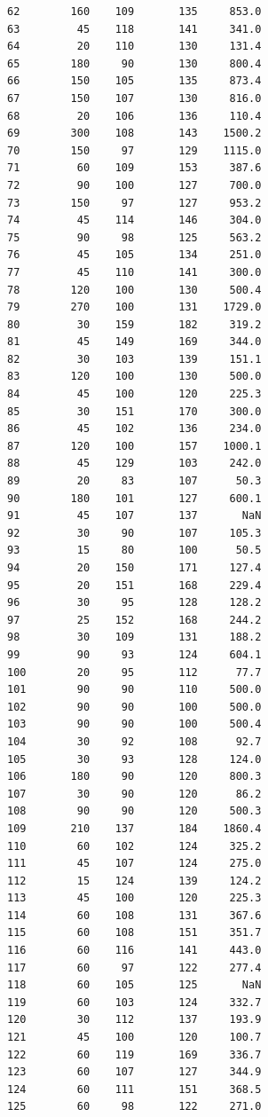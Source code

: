 \begin{code}
\begin{verbatim}
62        160    109       135     853.0
63         45    118       141     341.0
64         20    110       130     131.4
65        180     90       130     800.4
66        150    105       135     873.4
67        150    107       130     816.0
68         20    106       136     110.4
69        300    108       143    1500.2
70        150     97       129    1115.0
71         60    109       153     387.6
72         90    100       127     700.0
73        150     97       127     953.2
74         45    114       146     304.0
75         90     98       125     563.2
76         45    105       134     251.0
77         45    110       141     300.0
78        120    100       130     500.4
79        270    100       131    1729.0
80         30    159       182     319.2
81         45    149       169     344.0
82         30    103       139     151.1
83        120    100       130     500.0
84         45    100       120     225.3
85         30    151       170     300.0
86         45    102       136     234.0
87        120    100       157    1000.1
88         45    129       103     242.0
89         20     83       107      50.3
90        180    101       127     600.1
91         45    107       137       NaN
92         30     90       107     105.3
93         15     80       100      50.5
94         20    150       171     127.4
95         20    151       168     229.4
96         30     95       128     128.2
97         25    152       168     244.2
98         30    109       131     188.2
99         90     93       124     604.1
100        20     95       112      77.7
101        90     90       110     500.0
102        90     90       100     500.0
103        90     90       100     500.4
104        30     92       108      92.7
105        30     93       128     124.0
106       180     90       120     800.3
107        30     90       120      86.2
108        90     90       120     500.3
109       210    137       184    1860.4
110        60    102       124     325.2
111        45    107       124     275.0
112        15    124       139     124.2
113        45    100       120     225.3
114        60    108       131     367.6
115        60    108       151     351.7
116        60    116       141     443.0
117        60     97       122     277.4
118        60    105       125       NaN
119        60    103       124     332.7
120        30    112       137     193.9
121        45    100       120     100.7
122        60    119       169     336.7
123        60    107       127     344.9
124        60    111       151     368.5
125        60     98       122     271.0

\end{verbatim}
\end{code}
